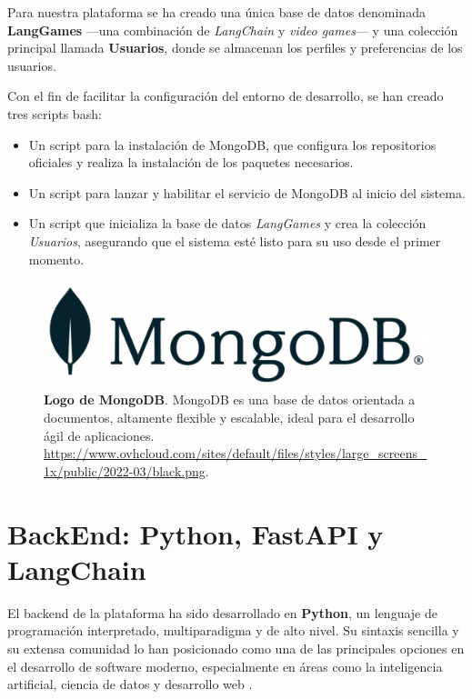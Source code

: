 Para nuestra plataforma se ha creado una única base de datos denominada \textbf{LangGames} —una combinación de \textit{LangChain} y \textit{video games}— y una colección principal llamada \textbf{Usuarios}, donde se almacenan los perfiles y preferencias de los usuarios.

Con el fin de facilitar la configuración del entorno de desarrollo, se han creado tres scripts bash:

\begin{itemize}
	\item Un script para la instalación de MongoDB, que configura los repositorios oficiales y realiza la instalación de los paquetes necesarios.
	\item Un script para lanzar y habilitar el servicio de MongoDB al inicio del sistema.
	\item Un script que inicializa la base de datos \textit{LangGames} y crea la colección \textit{Usuarios}, asegurando que el sistema esté listo para su uso desde el primer momento.
\end{itemize}

\begin{figure}[H]
	\centering
	\includegraphics[width=1\linewidth]{imagenes/mongoDBLogo.png}
	\caption[\textbf{Logo de MongoDB}.]{\textbf{Logo de MongoDB}. MongoDB es una base de datos orientada a documentos, altamente flexible y escalable, ideal para el desarrollo ágil de aplicaciones. \href{https://www.ovhcloud.com/sites/default/files/styles/large_screens_1x/public/2022-03/black.png}{https://www.ovhcloud.com/sites/default/files/styles/large\_screens\_1x/public/2022-03/black.png}.}
	\label{fig:mongodb-logo}
\end{figure}


\newpage

\section{BackEnd: Python, FastAPI y LangChain}

El backend de la plataforma ha sido desarrollado en \textbf{Python}, un lenguaje de programación interpretado, multiparadigma y de alto nivel. Su sintaxis sencilla y su extensa comunidad lo han posicionado como una de las principales opciones en el desarrollo de software moderno, especialmente en áreas como la inteligencia artificial, ciencia de datos y desarrollo web \cite{patkar2022python}.

